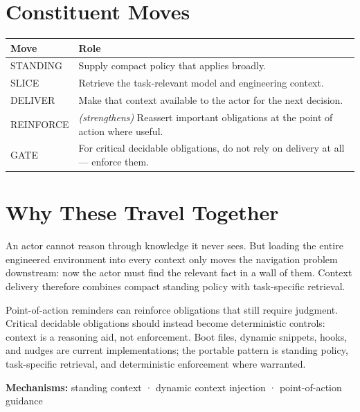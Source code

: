 \section{Constituent Moves}\label{heading:constituent-moves}

{\footnotesize
{\def\LTcaptype{none} %
\begin{longtable}[]{@{}
  >{\raggedright\arraybackslash}p{}
  >{\raggedright\arraybackslash}p{}@{}}
\toprule\noalign{}
\begin{minipage}[b]{\linewidth}\raggedright
Move
\end{minipage} & \begin{minipage}[b]{\linewidth}\raggedright
Role
\end{minipage} \\
\midrule\noalign{}
\endhead
\bottomrule\noalign{}
\endlastfoot
STANDING & Supply compact policy that applies broadly. \\
SLICE & Retrieve the task-relevant model and engineering context. \\
DELIVER & Make that context available to the actor for the next decision. \\
REINFORCE & \emph{(strengthens)} Reassert important obligations at the point of action where useful. \\
GATE & For critical decidable obligations, do not rely on delivery at all --- enforce them. \\
\end{longtable}
}
}

\section{Why These Travel Together}\label{heading:why-these-travel-together}

An actor cannot reason through knowledge it never sees. But loading the entire engineered environment into every context only moves the navigation problem downstream: now the actor must find the relevant fact in a wall of them. Context delivery therefore combines compact standing policy with task-specific retrieval.

Point-of-action reminders can reinforce obligations that still require judgment. Critical decidable obligations should instead become deterministic controls: context is a reasoning aid, not enforcement. Boot files, dynamic snippets, hooks, and nudges are current implementations; the portable pattern is standing policy, task-specific retrieval, and deterministic enforcement where warranted.

\textbf{Mechanisms:} standing context · dynamic context injection · point-of-action guidance
